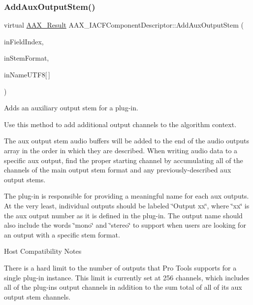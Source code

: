 \subsubsection{\texorpdfstring{AddAuxOutputStem()}{AddAuxOutputStem()}}
{\footnotesize\ttfamily virtual \mbox{\hyperlink{a00392_a4d8f69a697df7f70c3a8e9b8ee130d2f}{A\+A\+X\+\_\+\+Result}} A\+A\+X\+\_\+\+I\+A\+C\+F\+Component\+Descriptor\+::\+Add\+Aux\+Output\+Stem (\begin{DoxyParamCaption}\item[{\mbox{\hyperlink{a00392_ae807f8986143820cfb5d6da32165c9c7}{A\+A\+X\+\_\+\+C\+Field\+Index}}}]{in\+Field\+Index,  }\item[{int32\+\_\+t}]{in\+Stem\+Format,  }\item[{const char}]{in\+Name\+U\+T\+F8\mbox{[}$\,$\mbox{]} }\end{DoxyParamCaption})\hspace{0.3cm}{\ttfamily [pure virtual]}}



Adds an auxiliary output stem for a plug-\/in. 

Use this method to add additional output channels to the algorithm context.

The aux output stem audio buffers will be added to the end of the audio outputs array in the order in which they are described. When writing audio data to a specific aux output, find the proper starting channel by accumulating all of the channels of the main output stem format and any previously-\/described aux output stems.

The plug-\/in is responsible for providing a meaningful name for each aux outputs. At the very least, individual outputs should be labeled \char`\"{}\+Output xx\char`\"{}, where \char`\"{}xx\char`\"{} is the aux output number as it is defined in the plug-\/in. The output name should also include the words \char`\"{}mono\char`\"{} and \char`\"{}stereo\char`\"{} to support when users are looking for an output with a specific stem format.

\begin{DoxyRefDesc}{Host Compatibility Notes}
\item[\mbox{\hyperlink{a00786__compatibility_notes000055}{Host Compatibility Notes}}]There is a hard limit to the number of outputs that Pro Tools supports for a single plug-\/in instance. This limit is currently set at 256 channels, which includes all of the plug-\/in\textquotesingle{}s output channels in addition to the sum total of all of its aux output stem channels.\end{DoxyRefDesc}


